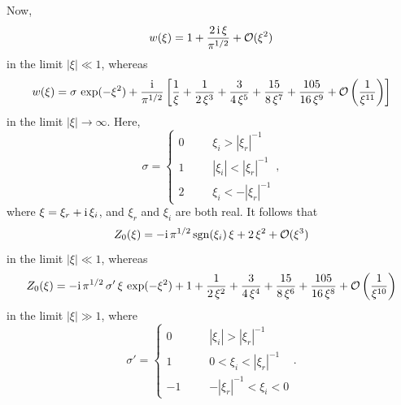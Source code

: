 \documentclass[12pt,prb,aps]{revtex4-1}
\begin{document}
Now,\cite{rf0,as}
\begin{equation}
w(\xi)=1+\frac{2\,{\rm i}\,\xi}{\pi^{1/2}}+{\cal O}(\xi^2)
\end{equation}
in the limit $|\xi|\ll 1$, whereas
\begin{equation}
w(\xi) = \sigma\,\exp(-\xi^2)+ \frac{{\rm i}}{\pi^{1/2}}\left[\frac{1}{\xi} + \frac{1}{2\,\xi^3}+\frac{3}{4\,\xi^5}+\frac{15}{8\,\xi^7}+
\frac{105}{16\,\xi^{9}}+{\cal O}\left(\frac{1}{\xi^{11}}\right)\right]
\end{equation}
in the limit $|\xi|\rightarrow\infty$. 
Here,
\begin{equation}
\sigma = \left\{\begin{array}{lll} 0 &~~~~&\mbox{$\xi_i>|\xi_r|^{-1}$}\\[0.25ex]
1 &&\mbox{$|\xi_i| < |\xi_r|^{-1}$}\\[0.25ex]
2&& \mbox{$\xi_i< -|\xi_r|^{-1}$}
\end{array}
\right.,
\end{equation}
where $\xi=\xi_r+{\rm i}\,\xi_i$, and $\xi_r$ and $\xi_i$ are both real. 
It follows that
\begin{equation}\label{e63x}
Z_0(\xi) = -{\rm i}\,\pi^{1/2}\,{\rm sgn}(\xi_i)\,\xi +2\,\xi^2+{\cal O}(\xi^3)
\end{equation}
in the limit $|\xi|\ll 1$, whereas 
\begin{equation}\label{e64x}
Z_0(\xi) =- {\rm i}\,\pi^{1/2}\,\sigma'\,\xi\,\exp(-\xi^2) + 1 + \frac{1}{2\,\xi^2}+\frac{3}{4\,\xi^4}+\frac{15}{8\,\xi^6}+\frac{105}{16\,\xi^8}+{\cal O}\left(\frac{1}{\xi^{10}}\right)
\end{equation}
in the limit $|\xi|\gg 1$,
where
\begin{equation}
\sigma' = \left\{\begin{array}{lll} 0 &~~~~&\mbox{$|\xi_i|>|\xi_r|^{-1}$}\\[0.25ex]
1 &&\mbox{$0<\xi_i < |\xi_r|^{-1}$}\\[0.25ex]
-1&& \mbox{$-|\xi_r|^{-1}<\xi_i<0$}
\end{array}
\right..
\end{equation}
\end{document}

